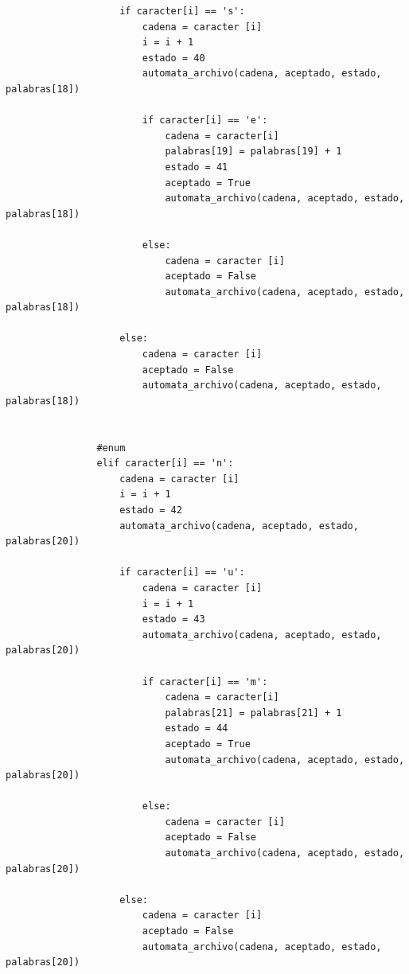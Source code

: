 \documentclass{article}
\begin{document}
\begin{flushleft}
\begin{lstlisting}
                    if caracter[i] == 's':
                        cadena = caracter [i]
                        i = i + 1
                        estado = 40
                        automata_archivo(cadena, aceptado, estado, palabras[18])
                        
                        if caracter[i] == 'e':
                            cadena = caracter[i]
                            palabras[19] = palabras[19] + 1
                            estado = 41
                            aceptado = True
                            automata_archivo(cadena, aceptado, estado, palabras[18])
                            
                        else:
                            cadena = caracter [i]
                            aceptado = False
                            automata_archivo(cadena, aceptado, estado, palabras[18])
                            
                    else:
                        cadena = caracter [i]
                        aceptado = False
                        automata_archivo(cadena, aceptado, estado, palabras[18])
                        
                        
                #enum
                elif caracter[i] == 'n':
                    cadena = caracter [i]
                    i = i + 1
                    estado = 42
                    automata_archivo(cadena, aceptado, estado, palabras[20])   
                    
                    if caracter[i] == 'u':
                        cadena = caracter [i]
                        i = i + 1
                        estado = 43
                        automata_archivo(cadena, aceptado, estado, palabras[20])
                        
                        if caracter[i] == 'm':
                            cadena = caracter[i]
                            palabras[21] = palabras[21] + 1
                            estado = 44
                            aceptado = True
                            automata_archivo(cadena, aceptado, estado, palabras[20])
                            
                        else:
                            cadena = caracter [i]
                            aceptado = False
                            automata_archivo(cadena, aceptado, estado, palabras[20])
                            
                    else:
                        cadena = caracter [i]
                        aceptado = False
                        automata_archivo(cadena, aceptado, estado, palabras[20])
                                         

\end{lstlisting}
\end{flushleft}
\end{document}
